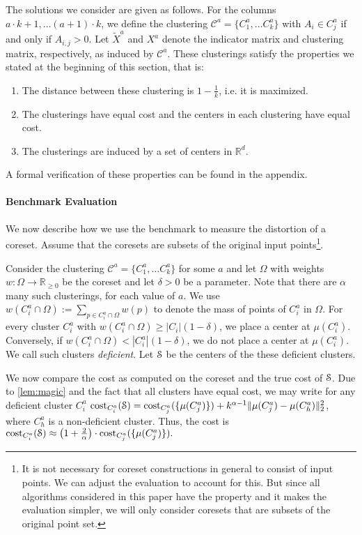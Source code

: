 The solutions we consider are given as follows. For the columns $a\cdot k+1,\ldots (a+1)\cdot k$, we define the clustering $\mathcal{C}^{a} = \{C_1^a,\ldots C_k^a\}$ with 
$A_i\in C_j^a$ if and only if $A_{i,j} > 0$. Let $\tilde X^a$ and $X^{a}$ denote the indicator matrix and clustering matrix, respectively, as induced by $\mathcal{C}^{a}$.
These clusterings satisfy the properties we stated at the beginning of this section, that is:
\begin{enumerate}
\item The distance between these clustering is $1-\frac{1}{k}$, i.e. it is maximized.
\item The clusterings have equal cost and the centers in each clustering have equal cost.
\item The clusterings are induced by a set of centers in $\mathbb{R}^d$.
\end{enumerate}
A formal verification of these properties can be found in the appendix.




\paragraph*{Benchmark Evaluation}

We now describe how we use the benchmark to measure the distortion of a coreset. Assume that the coresets are subsets of the original input points\footnote{It is not necessary for coreset constructions in general to consist of input points. We can adjust the evaluation to account for this. But since all algorithms considered in this paper have the property and it makes the evaluation simpler, we will only consider coresets that are subsets of the original point set.}.

Consider the clustering $\mathcal{C}^{a} = \{C_1^a,\ldots C_k^a\}$ for some $a$ and let $\Omega$ with weights $w:\Omega\rightarrow \mathbb{R}_{\geq 0}$ be the coreset and let $\delta>0$ be a parameter. 
Note that there are $\alpha$ many such clusterings, for each value of $a$.
We use $w(C_i^a \cap \Omega):=\sum_{p\in C_i^a \cap \Omega} w(p)$ to denote the mass of points of $C_i^a$ in $\Omega$.
For every cluster $C_i^a$ with $w(C_i^a \cap \Omega)\geq |C_i| (1-\delta)$, we place a center at $\mu(C_i^a)$. Conversely, if $w(C_i^a \cap \Omega)< |C_i^a| (1-\delta)$, we do not place a center at $\mu(C_i^a)$. We call such clusters \emph{deficient}. Let $\mathcal{S}$ be the centers of the these deficient clusters.

We now compare the cost as computed on the coreset and the true cost of $\mathcal{S}$. Due to \cref{lem:magic} and the fact that all clusters have equal cost, we may write for any deficient cluster $C_i^a$
$\text{cost}_{C_i^a}(\mathcal{S}) = \text{cost}_{C_j^a}(\{\mu(C_j^a)\}) + k^{\alpha-1}\|\mu(C_j^a)-\mu(C_h^a)\|_2^2$, where $C_h^a$ is a non-deficient cluster.
Thus, the cost is $\text{cost}_{C_i^a}(\mathcal{S}) \approx \left(1+\frac{2}{\alpha}\right)\cdot \text{cost}_{C_j^a}(\{\mu(C_j^a)\}).$

